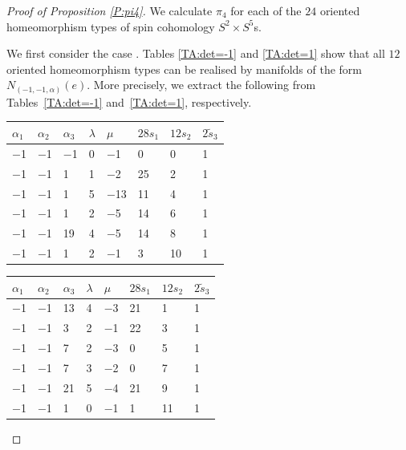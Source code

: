 \documentclass[pdftex]{sigma}
\numberwithin{equation}{section}
\theoremstyle{definition}
\numberwithin{table}{section}
\begin{document}
\begin{proof}[Proof of Proposition \ref{P:pi4}]
	We calculate $\pi_4$ for each of the $24$ oriented homeomorphism types of spin cohomology $S^2\times S^5$s.
	
	We first consider the case . Tables \ref{TA:det=-1} and \ref{TA:det=1} show that all $12$ oriented homeomorphism types can be realised by manifolds of the form $N_{(-1,-1,\alpha)}(e)$. More precisely, we extract the following from Tables~\ref{TA:det=-1} and~\ref{TA:det=1}, respectively.

	\vspace{0.3cm}

	\begin{paracol}{2}\centering
		\begin{supertabular}{|w{c}{.5cm}w{c}{.5cm}w{c}{.5cm}w{c}{.5cm}w{c}{.5cm}|w{c}{.5cm}w{c}{.5cm}w{c}{.5cm}|}
			\hline $\alpha_1$ & $\alpha_2$ & $\alpha_3$ & $\lambda$ & $\mu$ & $28s_1$ & $12s_2$ & $2\tilde{s}_3$ \\ \hline
			$-$1 & $-$1 & $-$1 & 0 & $-$1 & 0 & 0 & 1 \\
			$-$1 & $-$1 & 1 & 1 & $-$2 & 25 & 2 & 1\\
			$-$1 & $-$1 & 1 & 5 & $-$13 & 11 & 4 & 1\\
			$-$1 & $-$1 & 1 & 2 & $-$5 & 14 & 6 & 1\\
			$-$1 & $-$1 & 19 & 4 & $-$5 & 14 & 8 & 1\\
			$-$1 & $-$1 & 1 & 2 & $-$1 & 3 & 10 & 1\\\hline
		\end{supertabular}
		
		\switchcolumn
		
		\begin{supertabular}{|w{c}{.5cm}w{c}{.5cm}w{c}{.5cm}w{c}{.5cm}w{c}{.5cm}|w{c}{.5cm}w{c}{.5cm}w{c}{.5cm}|}
			\hline $\alpha_1$ & $\alpha_2$ & $\alpha_3$ & $\lambda$ & $\mu$ & $28s_1$ & $12s_2$ & $2\tilde{s}_3$ \\ \hline
			$-$1 & $-$1 & 13 & 4 & $-$3 & 21 & 1 & 1\\
			$-$1 & $-$1 & 3 & 2 & $-$1 & 22 & 3 & 1\\
			$-$1 & $-$1 & 7 & 2 & $-$3 & 0 & 5 & 1\\
			$-$1 & $-$1 & 7 & 3 & $-$2 & 0 & 7 & 1\\
			$-$1 & $-$1 & 21 & 5 & $-$4 & 21 & 9 & 1\\
			$-$1 & $-$1 & 1 & 0 & $-$1 & 1 & 11 & 1\\ \hline
		\end{supertabular}
	\end{paracol}
	

\end{proof}
\end{document}
